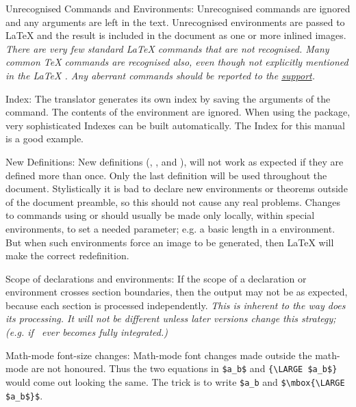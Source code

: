 \begin{htmllist}
\item [Unrecognised Commands and Environments:\index{unrecognised commands} ]
Unrecognised commands are ignored and any arguments are left in the text. 
Unrecognised environments are passed to \LaTeX{}  and the result is
included in the document as one or more inlined images.
\newline\textit
{There are very few standard \LaTeX{} commands that are not recognised.
Many common \TeX{} commands are recognised also,
even though not explicitly mentioned 
in the \LaTeX{} .
Any aberrant commands should be reported to the \latextohtml{}
\hyperref{mailing list}{mailing list, see Section~}{}{support}.}


\item [Index: ]
The translator generates its own index by saving the arguments  of 
the  command. The contents of the 
environment are ignored.
When using the  package,
very sophisticated Indexes can be built automatically.
The Index for this manual is a good example.


\item[New Definitions:\index{extensions!definitions} ]
New definitions (, , 
 and ),
will not work as expected if they are defined more than once.
Only the last definition will be used throughout the document.
Stylistically it is bad to declare new
environments or theorems outside of the document preamble,
so this should not cause any real problems.\html{\\}
Changes to commands using  or 
should usually be made only locally, within special environments,
to set a needed parameter; 
e.g. a basic length in a  environment.
But when such environments force an image to be generated,
then \LaTeX{} will make the correct redefinition.

\item [Scope of declarations and environments: ]
If the scope of a declaration or environment crosses section
boundaries, then the output may not be as expected, because each
section is processed independently.
\newline
\textit{This is inherent to the way \latextohtml{} does its processing. 
It will not be different unless later versions change this strategy;
(e.g. if \latextohtmlNG\ ever becomes fully integrated.)}

\item [Math-mode font-size changes: ]  Math-mode font changes
made outside the math-mode are not honoured.  Thus the two equations
in \verb|$a_b$| and \verb|{\LARGE $a_b$}|
would come out looking the same.  The trick is to write
\verb|$a_b| and \verb|$\mbox{\LARGE $a_b$}$|.
\end{htmllist}



